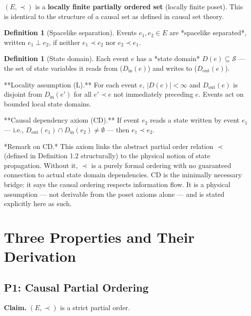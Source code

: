 \documentclass[11pt]{article}
\theoremstyle{definition}
\newtheorem{definition}[theorem]{Definition}
\theoremstyle{remark}
\begin{document}
\((E, \prec)\) is a \textbf{locally finite partially ordered set}
(locally finite poset). This is identical to the structure of a causal
set as defined in causal set theory.

\begin{definition}[Spacelike separation]
\label{definition:1-3}
Events $e_1, e_2 \in E$ are *spacelike separated*, written $e_1 \perp e_2$, if neither $e_1 \prec e_2$ nor $e_2 \prec e_1$.

\end{definition}

\begin{definition}[State domain]
\label{definition:1-4}
Each event $e$ has a *state domain* $D(e) \subseteq \mathcal{S}$ — the set of state variables it reads from ($D_{\text{in}}(e)$) and writes to ($D_{\text{out}}(e)$).

**Locality assumption (L).** For each event $e$, $|D(e)| < \infty$ and $D_{\text{out}}(e)$ is disjoint from $D_{\text{in}}(e')$ for all $e' \prec e$ not immediately preceding $e$. Events act on bounded local state domains.

**Causal dependency axiom (CD).** If event $e_2$ reads a state written by event $e_1$ — i.e., $D_{\text{out}}(e_1) \cap D_{\text{in}}(e_2) \neq \emptyset$ — then $e_1 \prec e_2$.

*Remark on CD.* This axiom links the abstract partial order relation $\prec$ (defined in Definition 1.2 structurally) to the physical notion of state propagation. Without it, $\prec$ is a purely formal ordering with no guaranteed connection to actual state domain dependencies. CD is the minimally necessary bridge: it says the causal ordering respects information flow. It is a physical assumption — not derivable from the poset axioms alone — and is stated explicitly here as such.
\end{definition}

\medskip

\section{Three Properties and Their
Derivation}\label{three-properties-and-their-derivation}

\subsection{P1: Causal Partial
Ordering}\label{p1-causal-partial-ordering}

\textbf{Claim.} \((E, \prec)\) is a strict partial order.
\end{document}
